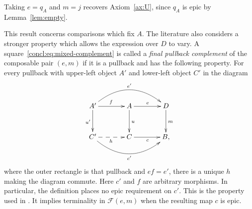 \documentclass[11pt,a4paper]{article}
\theoremstyle{plain}
\theoremstyle{definition}
\theoremstyle{remark}
\newcommand{\Fill}{\mathcal F}
\begin{document}
Taking $e=q_A$ and $m=j$ recovers Axiom~\ref{ax:U}, since
$q_A$ is epic by Lemma~\ref{lem:empty}.

This result concerns comparisons which fix $A$. The literature
also considers a stronger property which allows the expression
over $D$ to vary. A square~\eqref{concl:eq:mixed-complement} is
called a \emph{final pullback complement} of the composable pair
$(e,m)$ if it is a pullback and has the following property.
For every pullback with upper-left object $A'$ and lower-left
object $C'$ in the diagram
\[
\xymatrix@C=3.7em@R=3em{
A'\ar[r]^f\ar[d]_{u'}\ar@/^2pc/[rr]^{e'}&
 A\ar[r]^e\ar[d]^u&D\ar[d]^m\\
C'\ar@{-->}[r]_h\ar@/_2pc/[rr]_{c'}&C\ar[r]_c&B,
}
\]
where the outer rectangle is that pullback and $ef=e'$, there
is a unique $h$ making the diagram commute. Here $c'$ and $f$
are arbitrary morphisms. In particular, the definition places
no epic requirement on $c'$. This is the property used in
\cite[Definition~1]{CorradiniEtAl}. It implies terminality in
$\Fill(e,m)$ when the resulting map $c$ is epic.
\end{document}
